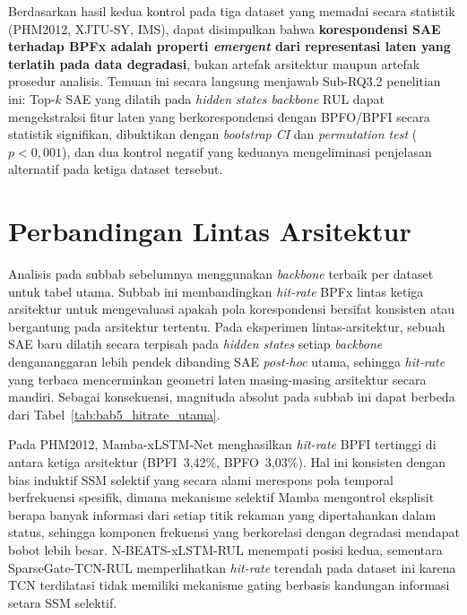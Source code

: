 Berdasarkan {\color{blue}hasil kedua kontrol pada tiga dataset yang
memadai secara statistik (PHM2012, XJTU-SY, IMS)}, dapat disimpulkan bahwa
\textbf{korespondensi SAE terhadap BPFx adalah properti \emph{emergent}
dari representasi laten yang terlatih pada data degradasi}, bukan artefak
arsitektur maupun artefak prosedur analisis.
Temuan ini secara langsung menjawab Sub-RQ3.2 penelitian ini: Top-$k$ SAE
yang dilatih pada \emph{hidden states backbone} RUL dapat mengekstraksi
fitur laten yang berkorespondensi dengan BPFO/BPFI secara statistik
signifikan, dibuktikan dengan \emph{bootstrap CI} dan \emph{permutation
test} ($p < 0{,}001$), dan dua kontrol negatif yang keduanya mengeliminasi
penjelasan alternatif {\color{blue}pada ketiga dataset tersebut}.

\section{Perbandingan Lintas Arsitektur}
\label{sec:bab5_perbandingan_arsitektur}

Analisis pada subbab sebelumnya menggunakan \emph{backbone} terbaik per
dataset untuk tabel utama.
Subbab ini membandingkan \emph{hit-rate} BPFx lintas ketiga arsitektur
untuk mengevaluasi apakah pola korespondensi bersifat konsisten atau
bergantung pada arsitektur tertentu.
{\color{blue}Pada eksperimen lintas-arsitektur, sebuah SAE baru dilatih
secara terpisah pada \emph{hidden states} setiap \emph{backbone} dengananggaran
lebih pendek dibanding SAE \emph{post-hoc} utama, sehingga \emph{hit-rate}
yang terbaca mencerminkan geometri laten masing-masing arsitektur secara
mandiri. Sebagai konsekuensi, magnituda absolut pada subbab ini dapat berbeda
dari Tabel~\ref{tab:bab5_hitrate_utama}.}

Pada PHM2012, Mamba-xLSTM-Net menghasilkan \emph{hit-rate} BPFI
tertinggi di antara ketiga arsitektur {\color{blue}(BPFI~3{,}42\%,
BPFO~3{,}03\%)}.
Hal ini konsisten dengan {\color{blue}bias induktif} SSM selektif yang secara alami
merespons pola temporal berfrekuensi spesifik, dimana mekanisme selektif Mamba
mengontrol eksplisit berapa banyak informasi dari setiap titik rekaman
yang dipertahankan dalam status, sehingga komponen frekuensi yang berkorelasi
dengan degradasi mendapat bobot lebih besar.
N-BEATS-xLSTM-RUL menempati posisi kedua, sementara SparseGate-TCN-RUL
memperlihatkan \emph{hit-rate} terendah pada dataset ini karena TCN
terdilatasi tidak memiliki mekanisme gating berbasis kandungan informasi
setara SSM selektif.

